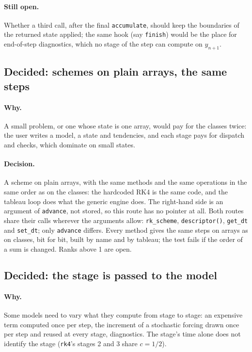 \documentclass[11pt,a4paper]{article}
\newcommand{\code}[1]{\texttt{#1}}
\begin{document}
\paragraph{Still open.} Whether a third call, after the final
\code{accumulate}, should keep the boundaries of the returned state applied;
the same hook (say \code{finish}) would be the place for end-of-step
diagnostics, which no stage of the step can compute on $y_{n+1}$.

\subsection{Decided: schemes on plain arrays, the same steps}

\paragraph{Why.} A small problem, or one whose state is one array, would pay
for the classes twice: the user writes a model, a state and tendencies, and
each stage pays for dispatch and checks, which dominate on small states.

\paragraph{Decision.} A scheme on plain arrays, with the same methods and
the same operations in the same order as on the classes: the hardcoded RK4
is the same code, and the tableau loop does what the generic engine does. The
right-hand side is an argument of \code{advance}, not stored, so this route
has no pointer at all. Both routes share their calls wherever the arguments
allow: \code{rk\_scheme}, \code{descriptor()}, \code{get\_dt} and
\code{set\_dt}; only \code{advance} differs. Every method gives the same steps
on arrays as on classes, bit for bit, built by name and by tableau; the test
fails if the order of a sum is changed. Ranks above 1 are open.

\subsection{Decided: the stage is passed to the model}

\paragraph{Why.} Some models need to vary what they compute from stage to
stage: an expensive term computed once per step, the increment of a
stochastic forcing drawn once per step and reused at every stage,
diagnostics. The stage's time alone does not identify the stage
(\code{rk4}'s stages 2 and 3 share $c = 1/2$).
\end{document}
